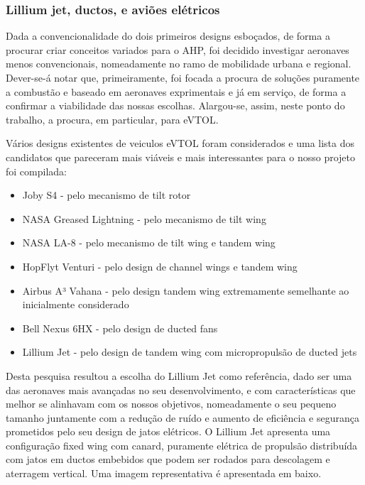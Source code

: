 \subsubsection{Lillium jet, ductos, e aviões elétricos}
Dada a convencionalidade do dois primeiros designs esboçados, de forma a procurar criar conceitos variados para o AHP, foi decidido investigar aeronaves menos convencionais, nomeadamente no ramo de mobilidade urbana e regional. Dever-se-á notar que, primeiramente, foi focada a procura de soluções puramente a combustão e baseado em aeronaves exprimentais e já em serviço, de forma a confirmar a viabilidade das nossas escolhas. Alargou-se, assim, neste ponto do trabalho, a procura, em particular, para eVTOL.\par
Vários designs existentes de veiculos eVTOL foram considerados e uma lista dos candidatos que pareceram mais viáveis e mais interessantes para o nosso projeto foi compilada:
\begin{itemize}
    \item Joby S4 - pelo mecanismo de tilt rotor
    \item NASA Greased Lightning - pelo mecanismo de tilt wing
    \item NASA LA-8 - pelo mecanismo de tilt wing e tandem wing
    \item HopFlyt Venturi - pelo design de channel wings e tandem wing
    \item Airbus A³ Vahana - pelo design tandem wing extremamente semelhante ao inicialmente considerado
    \item Bell Nexus 6HX - pelo design de ducted fans
    \item Lillium Jet - pelo design de tandem wing com micropropulsão de ducted jets 
\end{itemize}
Desta pesquisa resultou a escolha do Lillium Jet como referência, dado ser uma das aeronaves mais avançadas no seu desenvolvimento, e com características que melhor se alinhavam com os nossos objetivos, nomeadamente o seu pequeno tamanho juntamente com a redução de ruído e aumento de eficiência e segurança prometidos pelo seu design de jatos elétricos. 
O Lillium Jet apresenta uma configuração fixed wing com canard, puramente elétrica de propulsão distribuída com jatos em ductos embebidos que podem ser rodados para descolagem e aterragem vertical. Uma imagem representativa é apresentada em baixo.\par
\FloatBarrier

